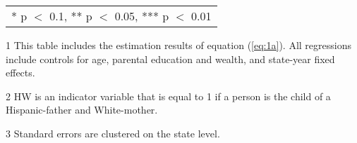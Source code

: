 \begin{table}[H]
\begin{threeparttable}
\begin{tabular}[t]{lcccc}
\bottomrule
\multicolumn{5}{l}{\rule{0pt}{1em}* p $<$ 0.1, ** p $<$ 0.05, *** p $<$ 0.01}\\
\end{tabular}
\begin{tablenotes}
\item[1] {\footnotesize{This table includes the estimation results of equation (\ref{eq:1a}). All regressions include controls for age, parental education and wealth, and state-year fixed effects.}}
\item[2] {\footnotesize{HW is an indicator variable that is equal to 1 if a person is the child of a Hispanic-father and White-mother.}}
\item[3] {\footnotesize{Standard errors are clustered on the state level.}}
\end{tablenotes}
\end{threeparttable}
\end{table}
